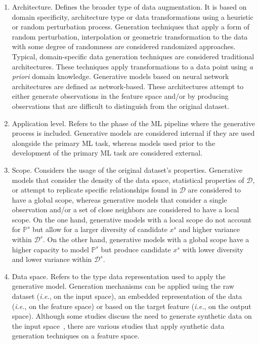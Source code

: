 \documentclass[parskip=full]{scrartcl}
\begin{document}
\begin{enumerate}

    \item Architecture. Defines the broader type of data augmentation. It is
        based on domain specificity, architecture type or data transformations
        using a heuristic or random perturbation process. Generation
        techniques that apply a form of random perturbation, interpolation or
        geometric transformation to the data with some degree of randomness
        are considered randomized approaches. Typical, domain-specific data
        generation techniques are considered traditional architectures. These
        techniques apply transformations to a data point using \textit{a
        priori} domain knowledge. Generative models based on neural network
        architectures are defined as network-based. These architectures
        attempt to either generate observations in the feature space and/or by
        producing observations that are difficult to distinguish from the
        original dataset.

    \item Application level. Refers to the phase of the ML pipeline where the
        generative process is included. Generative models are considered
        internal if they are used alongside the primary ML task, whereas
        models used prior to the development of the primary ML task are
        considered external.

    \item Scope. Considers the usage of the original dataset's properties.
        Generative models that consider the density of the data space,
        statistical properties of $\mathcal{D}$, or attempt to replicate
        specific relationships found in $\mathcal{D}$ are considered to have
        a global scope, whereas generative models that consider a single
        observation and/or a set of close neighbors are considered to have a
        local scope. On the one hand, generative models with a local scope do
        not account for $\mathbb{P}^s$ but allow for a larger diversity of
        candidate $x^s$ and higher variance within $\mathcal{D}^s$. On the
        other hand, generative models with a global scope have a higher
        capacity to model $\mathbb{P}^s$ but produce candidate $x^s$ with
        lower diversity and lower variance within $\mathcal{D}^s$.

    \item Data space. Refers to the type data representation used to apply the
        generative model. Generation mechanisms can be applied using the raw
        dataset (\textit{i.e.}, on the input space), an embedded
        representation of the data (\textit{i.e.}, on the feature space) or
        based on the target feature (\textit{i.e.}, on the output space).
        Although some studies discuss the need to generate synthetic data on
        the input space~\cite{dankar2021fake, patki2016synthetic}, there are
        various studies that apply synthetic data generation techniques on a
        feature space.

\end{enumerate}
\end{document}
